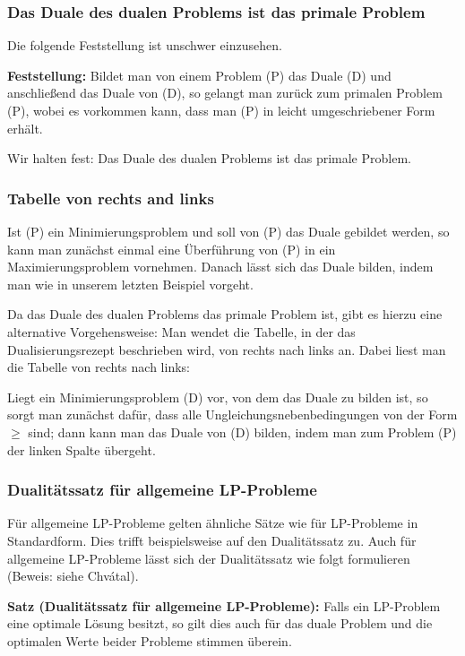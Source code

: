 \documentclass[smaller]{beamer}
\begin{document}
\begin{frame}
 \frametitle{Das Duale des dualen Problems ist das primale Problem}
 Die folgende Feststellung ist unschwer einzusehen. \\ \vspace*{0.2cm}

\textbf{Feststellung:}
Bildet man von einem Problem (P) das Duale (D) und anschließend das Duale von (D), so gelangt man zurück zum primalen Problem (P), wobei es vorkommen kann, dass man (P) in leicht umgeschriebener Form erhält.

Wir halten fest: \alert{Das Duale des dualen Problems ist das primale Problem}.
\end{frame}

\begin{frame}
 \frametitle{Tabelle von rechts and links}
  Ist (P) ein Minimierungsproblem und soll von (P) das Duale gebildet werden, so kann man zunächst einmal eine Überführung von (P) in ein Maximierungsproblem vornehmen. Danach lässt sich das Duale bilden, indem man wie in unserem letzten Beispiel vorgeht. \\ \vspace*{0.2cm}

Da das Duale des dualen Problems das primale Problem ist, gibt es hierzu eine \alert{alternative Vorgehensweise}: Man wendet die Tabelle, in der das Dualisierungsrezept beschrieben wird, \alert{von rechts nach links} an. Dabei liest man die Tabelle von rechts nach links: \\ \vspace*{0.2cm}

\begin{center}
\begin{minipage}{0.85\textwidth}
Liegt ein Minimierungsproblem (D) vor, von dem das Duale zu bilden ist, so sorgt man zunächst dafür, dass alle Ungleichungsnebenbedingungen von der Form {\glqq}$\geq${\grqq} sind; dann kann man das Duale von (D) bilden, indem man zum Problem (P) der linken Spalte übergeht.
\end{minipage}
\end{center}
\end{frame}

\begin{frame}
 \frametitle{Dualitätssatz für allgemeine LP-Probleme}
 Für allgemeine LP-Probleme gelten ähnliche Sätze wie für LP-Probleme in Standardform. Dies trifft beispielsweise auf den Dualitätssatz zu. Auch für allgemeine LP-Probleme lässt sich der Dualitätssatz wie folgt formulieren (Beweis: siehe Chv\'atal). \\ \vspace*{0.2cm}

\textbf{Satz (Dualitätssatz für allgemeine LP-Probleme):}
Falls ein LP-Problem eine optimale Lösung besitzt, so gilt dies auch für das duale Problem und die optimalen Werte beider Probleme stimmen überein.
\end{frame}
\end{document}
